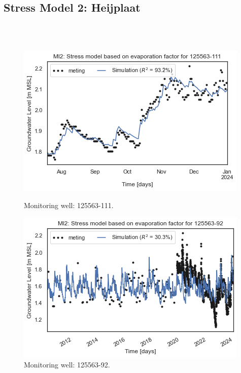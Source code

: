 \subsection{Stress Model 2: Heijplaat}\\
\\
\begin{figure}[htbp]
    \centering
    \begin{minipage}{0.32\textwidth}
        \centering
        \includegraphics[width=\linewidth]{frontmatter/Heijplaat-fig/12556-111.png}
        \caption{Monitoring well: 125563-111.}
        \label{SM: 125563-111}
    \end{minipage}
    \hfill
    \begin{minipage}{0.32\textwidth}
        \centering
        \includegraphics[width=\linewidth]{frontmatter/Heijplaat-fig/125563-92.png}
        \caption{Monitoring well: 125563-92.}

\end{minipage}
\end{figure}
